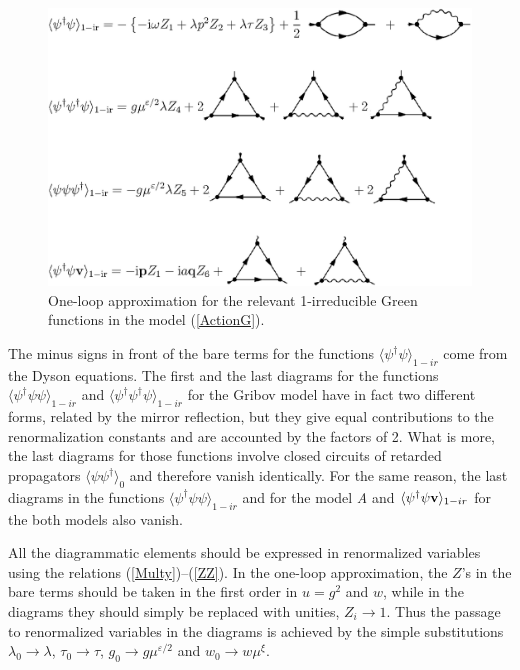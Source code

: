 \documentclass[12pt]{article}
\begin{document}
\begin{figure}
\begin{center}
\includegraphics[width=15cm]{MODELG.EPS}
\caption{\label{fig:DG}
One-loop approximation for the relevant 1-irreducible Green functions
in the model (\protect\ref{ActionG}).}
\end{center}
\end{figure}



The minus signs in front of the bare terms for the functions
$\langle \psi^{\dag} \psi \rangle_{1-ir}$ come from the Dyson equations.
The first and the last diagrams for the functions
$\langle \psi^{\dag} \psi \psi  \rangle_{1-ir}$ and
$\langle \psi^{\dag} \psi^{\dag} \psi \rangle_{1-ir}$ for the Gribov model
have in fact two different forms, related by the mirror reflection,
but they give equal contributions to the renormalization constants and
are accounted by the factors of 2.
What is more, the last diagrams for those functions involve closed circuits
of retarded propagators $\langle \psi \psi^{\dag} \rangle_{0}$ and therefore
vanish identically. For the same reason, the last diagrams in the functions
$\langle \psi^{\dag} \psi \psi  \rangle_{1-ir}$ and for the model {\it A}
and $\langle \psi^{\dag}\psi {\bf v} \rangle_{1-ir}$ for the both models
also vanish.

All the diagrammatic elements should be expressed in renormalized variables
using the relations (\ref{Multy})--(\ref{ZZ}). In the one-loop approximation,
the $Z$'s in the bare terms should be taken in the first order in $u= g^{2}$
and $w$, while in the diagrams they should simply be replaced with unities,
$Z_{i} \to 1$. Thus the passage to renormalized variables in the diagrams
is achieved by the simple substitutions
$\lambda_{0} \to \lambda$, $\tau_{0} \to \tau$,
$g_{0} \to g\mu^{\varepsilon/2}$ and $w_{0} \to w\mu^{\xi}$.
\end{document}

